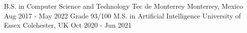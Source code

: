 \begin{cventries}
  \cventry
    {B.S. in Computer Science and Technology}
    {Tec de Monterrey}
    {Monterrey, Mexico} %
    {Aug 2017 - May 2022} %
    {Grade 93/100}
  \cventry
    {M.S. in Artificial Intelligence}
    {University of Essex}
    {Colchester, UK} %
    {Oct 2020 - Jun 2021} %
    {}
\end{cventries}